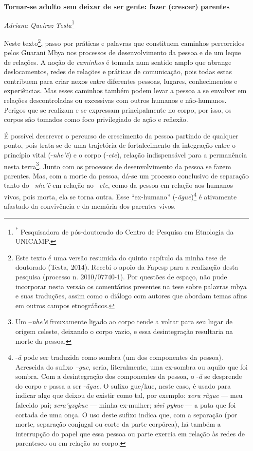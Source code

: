 \textbf{Tornar-se adulto sem deixar de ser gente: fazer (crescer)
parentes}

\emph{Adriana Queiroz Testa}\footnote{\textsuperscript{*} Pesquisadora
  de pós-doutorado do Centro de Pesquisa em Etnologia da UNICAMP.}

Neste texto\footnote{Este texto é uma versão resumida do quinto capítulo
  da minha tese de doutorado (Testa, 2014). Recebi o apoio da Fapesp
  para a realização desta pesquisa (processo n. 2010/07740-1). Por
  questões de espaço, não pude incorporar nesta versão os comentários
  presentes na tese sobre palavras mbya e suas traduções, assim como o
  diálogo com autores que abordam temas afins em outros campos
  etnográficos.}, passo por práticas e palavras que constituem caminhos
percorridos pelos Guarani Mbya nos processos de desenvolvimento da
pessoa e de um leque de relações. A noção de \emph{caminhos} é tomada
num sentido amplo que abrange deslocamentos, redes de relações e
práticas de comunicação, pois todas estas contribuem para criar nexos
entre diferentes pessoas, lugares, conhecimentos e experiências. Mas
esses caminhos também podem levar a pessoa a se envolver em relações
descontroladas ou excessivas com outros humanos e não-humanos. Perigos
que se realizam e se expressam principalmente no corpo, por isso, os
corpos são tomados como foco privilegiado de ação e reflexão.

É possível descrever o percurso de crescimento da pessoa partindo de
qualquer ponto, pois trata-se de uma trajetória de fortalecimento da
integração entre o princípio vital (-\emph{nhe'ẽ}) e o corpo
(\emph{-ete}), relação indispensável para a permanência nesta
terra\footnote{Um --\emph{nhe'ẽ} frouxamente ligado ao corpo tende a
  voltar para seu lugar de origem celeste, deixando o corpo vazio, e
  essa desintegração resultaria na morte da pessoa.}. Junto com os
processos de desenvolvimento da pessoa se fazem parentes. Mas, com a
morte da pessoa, dá-se um processo conclusivo de separação tanto do
--\emph{nhe'ẽ} em relação ao \emph{--ete}, como da pessoa em relação aos
humanos vivos, pois morta, ela se torna outra. Esse ``ex-humano''
(-\emph{ãgue})\footnote{-\emph{ã} pode ser traduzida como sombra (um dos
  componentes da pessoa). Acrescida do sufixo \emph{--gue}, seria,
  literalmente, uma ex-sombra ou aquilo que foi sombra. Com a
  desintegração dos componentes da pessoa, o -\emph{ã} se desprende do
  corpo e passa a ser -\emph{ãgue}. O sufixo gue/kue, neste caso, é
  usado para indicar algo que deixou de existir como tal, por exemplo:
  \emph{xeru rãgue} --- meu falecido pai; \emph{xera'yxykue} --- minha
  ex-mulher; \emph{xivi pykue} --- a pata que foi cortada de uma onça. O
  uso deste sufixo indica que, com a separação (por morte, separação
  conjugal ou corte da parte corpórea), há também a interrupção do papel
  que essa pessoa ou parte exercia em relação às redes de parentesco ou
  em relação ao corpo.} é ativamente afastado da convivência e da
memória dos parentes vivos.

